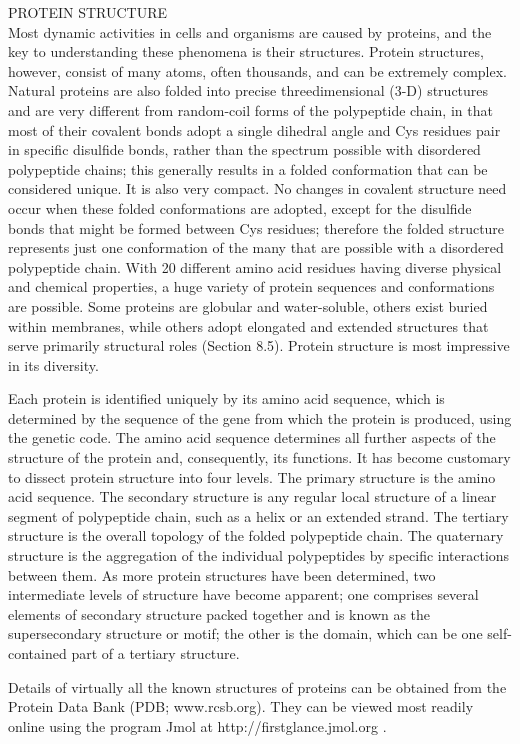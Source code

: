 PROTEIN STRUCTURE\\
Most dynamic activities in cells and organisms are caused by proteins, and the key to understanding these phenomena is their structures. Protein structures, however, consist of many atoms, often thousands, and can be extremely complex. Natural proteins are also folded into precise threedimensional (3-D) structures and are very different from random-coil forms of the polypeptide chain, in that most of their covalent bonds adopt a single dihedral angle and Cys residues pair in specific disulfide bonds, rather than the spectrum possible with disordered polypeptide chains; this generally results in a folded conformation that can be considered unique. It is also very compact. No changes in covalent structure need occur when these folded conformations are adopted, except for the disulfide bonds that might be formed between Cys residues; therefore the folded structure represents just one conformation of the many that are possible with a disordered polypeptide chain. With 20 different amino acid residues having diverse physical and chemical properties, a huge variety of protein sequences and conformations are possible. Some proteins are globular and water-soluble, others exist buried within membranes, while others adopt elongated and extended structures that serve primarily structural roles (Section 8.5).
Protein structure is most impressive in its diversity.

Each protein is identified uniquely by its amino acid sequence, which is determined by the sequence of the gene from which the protein is produced, using the genetic code. The amino acid sequence determines all further aspects of the structure of the protein and, consequently, its functions. It has become customary to dissect protein structure into four levels.
The primary structure is the amino acid sequence. The secondary structure is any regular local structure of a linear segment of polypeptide chain, such as a helix or an extended strand. The tertiary structure is the overall topology of the folded polypeptide chain. The quaternary structure is the aggregation of the individual polypeptides by specific interactions between them.
As more protein structures have been determined, two intermediate levels of structure have become apparent; one comprises several elements of secondary structure packed together and is known as the supersecondary structure or motif; the other is the domain, which can be one self-contained part of a tertiary structure.

Details of virtually all the known structures of proteins can be obtained from the Protein Data Bank (PDB; www.rcsb.org). They can be viewed most readily online using the program Jmol at http://firstglance.jmol.org
\cite{creighton2010biophysical}.


